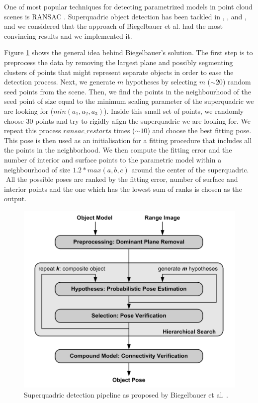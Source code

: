 \documentclass{article}
\begin{document}
One of most popular techniques for detecting parametrized models in point cloud scenes is RANSAC \cite{fischler1981random}. Superquadric object detection has been tackled in \cite{afanasyev3d}, \cite{conf/caip/KrivicS01}, and \cite{conf/icra/BiegelbauerV07}, and we considered that the approach of Biegelbauer et al. \cite{conf/icra/BiegelbauerV07} had the most convincing results and we implemented it.

Figure \ref{fig:superquadric_detection_schematic} shows the general idea behind Biegelbauer's solution. The first step is to preprocess the data by removing the largest plane and possibly segmenting clusters of points that might represent separate objects in order to ease the detection process. Next, we generate $m$ hypotheses by selecting $m$ ($\sim 20$) random seed points from the scene. Then, we find the points in the neighbourhood of the seed point of size equal to the minimum scaling parameter of the superquadric we are looking for ($min (a_1, a_2, a_3)$). Inside this small set of points, we randomly choose 30 points and try to rigidly align the superquadric we are looking for. We repeat this process $ransac\_restarts$ times ($\sim 10$) and choose the best fitting pose. This pose is then used as an initialisation for a fitting procedure that includes all the points in the neighborhood. We then compute the fitting error and the number of interior and surface points to the parametric model within a neighbourhood of size $1.2 * max(a,b,c)$ around the center of the superquadric. All the possible poses are ranked by the fitting error, number of surface and interior points and the one which has the lowest sum of ranks is chosen as the output.

\begin{figure}
\centering
\includegraphics[width=0.55\columnwidth]{figures/superquadric_detection_schematic}

\caption{Superquadric detection pipeline as proposed by Biegelbauer et al. \cite{conf/icra/BiegelbauerV07}.}
\label{fig:superquadric_detection_schematic}
\end{figure}
\end{document}
